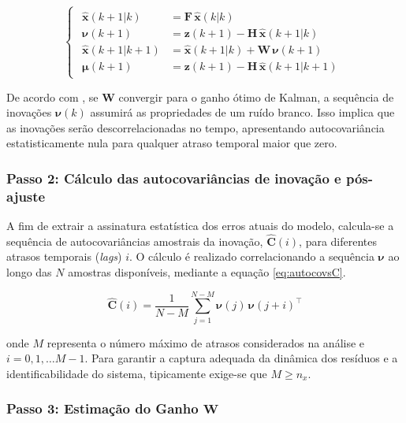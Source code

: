 \documentclass[journal]{IEEEtran}
\begin{document}
\begin{equation}
    \label{eq:kalman_steps}
    \begin{cases}
    \begin{split}
        \hat{\mathbf{x}}(k+1|k) &= \mathbf{F}\,\hat{\mathbf{x}}(k|k) \\
        \boldsymbol{\nu}(k+1) &= \mathbf{z}(k+1) - \mathbf{H}\,\hat{\mathbf{x}}(k+1|k) \\
        \hat{\mathbf{x}}(k+1|k+1) &= \hat{\mathbf{x}}(k+1|k) + \mathbf{W}\,\boldsymbol{\nu}(k+1) \\
        \boldsymbol{\mu}(k+1) &= \mathbf{z}(k+1) - \mathbf{H}\,\hat{\mathbf{x}}(k+1|k+1)
    \end{split}
    \end{cases}
\end{equation}

De acordo com \cite{zhang2020}, se $\mathbf{W}$ convergir para o ganho ótimo de Kalman, a sequência de inovações $\boldsymbol{\nu}(k)$ assumirá as propriedades de um ruído branco. Isso implica que as inovações serão descorrelacionadas no tempo, apresentando autocovariância estatisticamente nula para qualquer atraso temporal maior que zero.
\subsubsection{\textbf{Passo 2: Cálculo das autocovariâncias de inovação e pós-ajuste}}

A fim de extrair a assinatura estatística dos erros atuais do modelo, calcula-se a sequência de autocovariâncias amostrais da inovação, $\hat{\mathbf{C}}(i)$, para diferentes atrasos temporais (\textit{lags}) $i$. O cálculo é realizado correlacionando a sequência $\boldsymbol{\nu}$ ao longo das $N$ amostras disponíveis, mediante a equação \ref{eq:autocovsC}.

\begin{equation}
    \label{eq:autocovsC}
    \hat{\mathbf{C}}(i) = \frac{1}{N-M} \sum_{j=1}^{N-M} \boldsymbol{\nu}(j)\,\boldsymbol{\nu}(j+i)^\top
\end{equation}

onde $M$ representa o número máximo de atrasos considerados na análise e $i = 0, 1,\dots M-1$. Para garantir a captura adequada da dinâmica dos resíduos e a identificabilidade do sistema, tipicamente exige-se que $M \geq n_x$.

\subsubsection{\textbf{Passo 3: Estimação do Ganho $\mathbf{W}$}}
\end{document}
